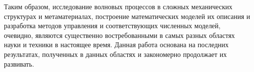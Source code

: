 Таким образом, исследование волновых процессов в сложных механических структурах и метаматериалах, построение математических моделей их описания и разработка методов управления и соответствующих численных моделей, очевидно, являются существенно востребованными в самых разных областях науки и техники в настоящее время. Данная работа основана на последних результатах, полученных в данных областях и закономерно продолжает их развивать. %




